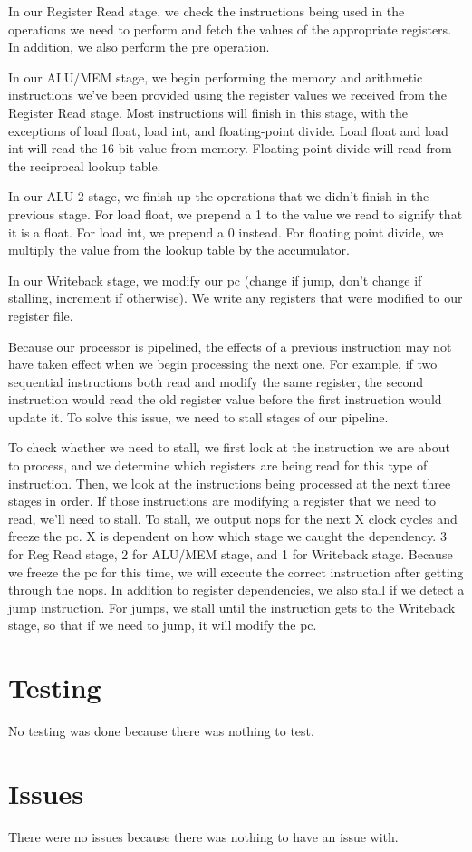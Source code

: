 \documentclass[sigconf]{acmart}
\begin{document}
In our Register Read stage, we check the instructions being used in the operations we need to perform and fetch the values of the appropriate registers. In addition, we also perform the pre operation.

In our ALU/MEM stage, we begin performing the memory and arithmetic instructions we’ve been provided using the register values we received from the Register Read stage. Most instructions will finish in this stage, with the exceptions of load float, load int, and floating-point divide. Load float and load int will read the 16-bit value from memory. Floating point divide will read from the reciprocal lookup table.

In our ALU 2 stage, we finish up the operations that we didn’t finish in the previous stage. For load float, we prepend a 1 to the value we read to signify that it is a float. For load int, we prepend a 0 instead. For floating point divide, we multiply the value from the lookup table by the accumulator.

In our Writeback stage, we modify our pc (change if jump, don’t change if stalling, increment if otherwise). We write any registers that were modified to our register file.

Because our processor is pipelined, the effects of a previous instruction may not have taken effect when we begin processing the next one. For example, if two sequential instructions both read and modify the same register, the second instruction would read the old register value before the first instruction would update it. To solve this issue, we need to stall stages of our pipeline.

To check whether we need to stall, we first look at the instruction we are about to process, and we determine which registers are being read for this type of instruction. Then, we look at the instructions being processed at the next three stages in order. If those instructions are modifying a register that we need to read, we'll need to stall. To stall, we output nops for the next X clock cycles and freeze the pc. X is dependent on how which stage we caught the dependency. 3 for Reg Read stage, 2 for ALU/MEM stage, and 1 for Writeback stage. Because we freeze the pc for this time, we will execute the correct instruction after getting through the nops. In addition to register dependencies, we also stall if we detect a jump instruction. For jumps, we stall until the instruction gets to the Writeback stage, so that if we need to jump, it will modify the pc. 


\section{Testing}
No testing was done because there was nothing to test.

\section{Issues}
There were no issues because there was nothing to have an issue with.
\end{document}
